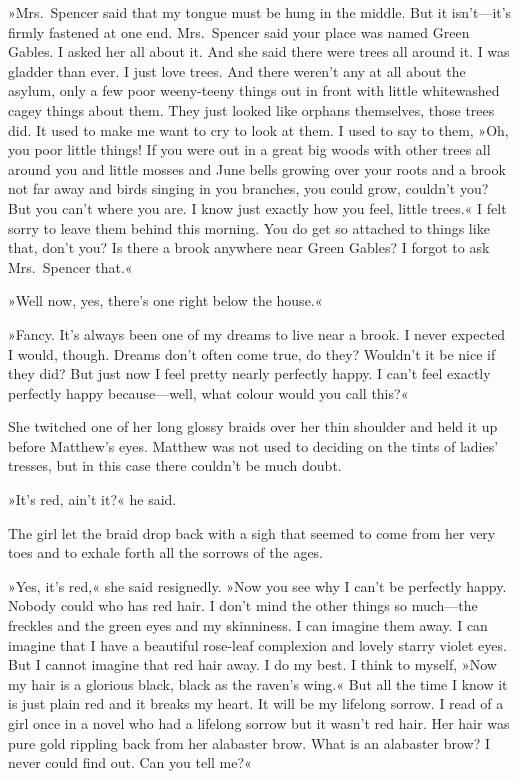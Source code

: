 »Mrs.~Spencer said that my tongue must be hung in the middle. But it isn't—it's firmly fastened at one end. Mrs.~Spencer said your place was named Green Gables. I asked her all about it. And she said there were trees all around it. I was gladder than ever. I just love trees. And there weren't any at all about the asylum, only a few poor weeny-teeny things out in front with little whitewashed cagey things about them. They just looked like orphans themselves, those trees did. It used to make me want to cry to look at them. I used to say to them, »Oh, you poor little things! If you were out in a great big woods with other trees all around you and little mosses and June bells growing over your roots and a brook not far away and birds singing in you branches, you could grow, couldn't you? But you can't where you are. I know just exactly how you feel, little trees.« I felt sorry to leave them behind this morning. You do get so attached to things like that, don't you? Is there a brook anywhere near Green Gables? I forgot to ask Mrs.~Spencer that.«

»Well now, yes, there's one right below the house.«

»Fancy. It's always been one of my dreams to live near a brook. I never expected I would, though. Dreams don't often come true, do they? Wouldn't it be nice if they did? But just now I feel pretty nearly perfectly happy. I can't feel exactly perfectly happy because—well, what colour would you call this?«

She twitched one of her long glossy braids over her thin shoulder and held it up before Matthew's eyes. Matthew was not used to deciding on the tints of ladies' tresses, but in this case there couldn't be much doubt.

»It's red, ain't it?« he said.

The girl let the braid drop back with a sigh that seemed to come from her very toes and to exhale forth all the sorrows of the ages.

»Yes, it's red,« she said resignedly. »Now you see why I can't be perfectly happy. Nobody could who has red hair. I don't mind the other things so much—the freckles and the green eyes and my skinniness. I can imagine them away. I can imagine that I have a beautiful rose-leaf complexion and lovely starry violet eyes. But I cannot imagine that red hair away. I do my best. I think to myself, »Now my hair is a glorious black, black as the raven's wing.« But all the time I know it is just plain red and it breaks my heart. It will be my lifelong sorrow. I read of a girl once in a novel who had a lifelong sorrow but it wasn't red hair. Her hair was pure gold rippling back from her alabaster brow. What is an alabaster brow? I never could find out. Can you tell me?«

